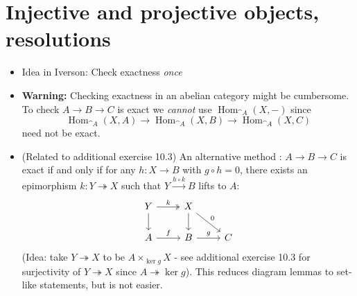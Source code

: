\documentclass[../main.tex]{subfiles}
\begin{document}
\chapter{Injective and projective objects, resolutions}



\begin{rmks} \leavevmode
    \begin{itemize}
        \item Idea in Iverson: Check exactness \emph{once}

        \item \textbf{Warning: } Checking exactness in an abelian category might be cumbersome. To check $A\to B\to C$ is exact we \emph{cannot} use $\operatorname{Hom}_{\cat A}(X, -)$ since
        \[\operatorname{Hom}_{\cat A}(X,A) \to \operatorname{Hom}_{\cat A}(X, B) \to \operatorname{Hom}_{\cat A}(X,C)\] need not be exact.
        \item (Related to additional exercise 10.3) An alternative method \cite[Tag~08N5]{stacks-project}: $A\to B\to C$ is exact if and only if for any $h\colon X\to B$ with $g\circ h= 0$, there exists an epimorphism $k\colon Y\twoheadrightarrow X$ such that $Y\xrightarrow{h\circ k} B$ lifts to $A$: 
        \[\begin{tikzcd}
        	Y & X \\
        	A & B & C
        	\arrow["k", two heads, from=1-1, to=1-2]
        	\arrow[from=1-1, to=2-1]
        	\arrow[from=1-2, to=2-2]
        	\arrow["0", from=1-2, to=2-3]
        	\arrow["f", from=2-1, to=2-2]
        	\arrow["g", from=2-2, to=2-3]
        \end{tikzcd}\]
        (Idea: take $Y\twoheadrightarrow X$ to be $A\times_{\ker g} X$ - see additional exercise 10.3 for surjectivity of $Y\twoheadrightarrow X$ since $A\twoheadrightarrow \ker g$). This reduces diagram lemmas to set-like statements, but is not easier.
    \end{itemize}
\end{rmks}
\end{document}
